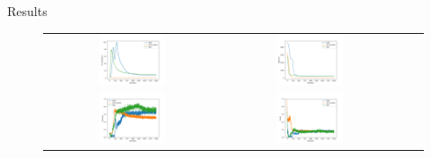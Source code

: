 \documentclass{beamer}
\begin{document}
\begin{frame}{Results}
\begin{figure}[h]
	\centering
	\begin{tabular}{cccc}
		\includegraphics[width=0.4\textwidth]{kldiv_03.png}
		& 
		\includegraphics[width=0.4\textwidth]{logp_03.png}\\
		\includegraphics[width=0.4\textwidth]{precisions_03.png}
		& 
		\includegraphics[width=0.4\textwidth]{recall_03.png}\\
	\end{tabular}
\end{figure}
\end{frame}
\end{document}
